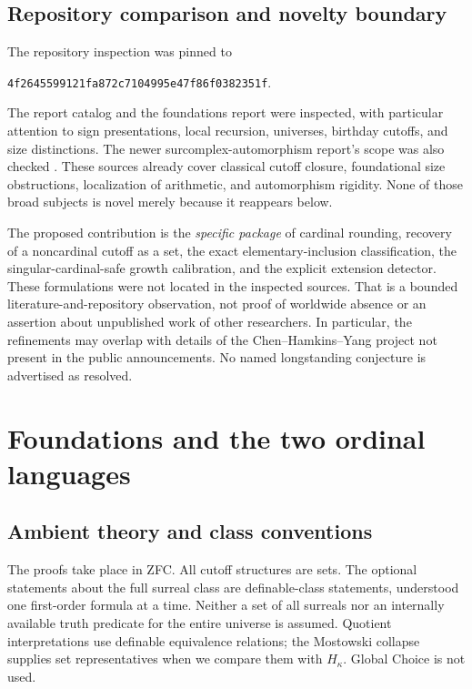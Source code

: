 \documentclass[11pt,letterpaper]{article}
\theoremstyle{definition}
\theoremstyle{remark}
\begin{document}
\subsection{Repository comparison and novelty boundary}

The repository inspection was pinned to
\begin{center}\small\texttt{4f2645599121fa872c7104995e47f86f0382351f}.\end{center}
The report catalog and the foundations report were inspected, with particular
attention to sign presentations, local recursion, universes, birthday
cutoffs, and size distinctions. The newer surcomplex-automorphism report's
scope was also checked \cite{RepoCatalog,RepoFoundations,RepoAutomorphisms}.
These sources already cover classical cutoff closure, foundational size
obstructions, localization of arithmetic, and automorphism rigidity. None of
those broad subjects is novel merely because it reappears below.

The proposed contribution is the \emph{specific package} of cardinal rounding,
recovery of a noncardinal cutoff as a set, the exact elementary-inclusion
classification, the singular-cardinal-safe growth calibration, and the
explicit extension detector. These formulations were not located in the
inspected sources. That is a bounded literature-and-repository observation,
not proof of worldwide absence or an assertion about unpublished work of
other researchers. In particular, the refinements may overlap with details
of the Chen--Hamkins--Yang project not present in the public announcements.
No named longstanding conjecture is advertised as resolved.

\section{Foundations and the two ordinal languages}
\label{sec:foundations}

\subsection{Ambient theory and class conventions}

The proofs take place in ZFC. All cutoff structures are sets. The optional
statements about the full surreal class are definable-class statements,
understood one first-order formula at a time. Neither a set of all surreals
nor an internally available truth predicate for the entire universe is
assumed. Quotient interpretations use definable equivalence relations; the
Mostowski collapse supplies set representatives when we compare them with
$H_\kappa$. Global Choice is not used.
\end{document}
